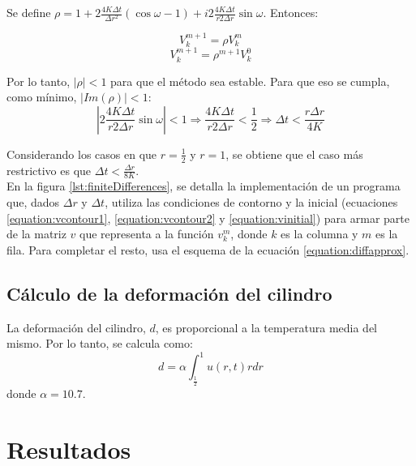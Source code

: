 \documentclass[journal, monochrome]{IEEEtran}
\begin{document}
Se define $\rho = 1 + 2 \frac{4K\Delta t}{\Delta r^{2}}(\cos \omega - 1) + i 2 \frac{4K\Delta t}{r 2\Delta r} \sin \omega$. Entonces:

\begin{equation}
V_{k}^{m+1} = \rho V_{k}^{m}
\end{equation}
\begin{equation}
V_{k}^{m+1} = \rho^{m+1} V_{k}^{0}
\end{equation}

Por lo tanto, $|\rho| < 1$ para que el método sea estable. Para que eso se cumpla, como mínimo, $|Im(\rho)| < 1$:
\begin{equation}
|2 \frac{4K\Delta t}{r 2\Delta r} \sin \omega| <1 \Rightarrow \frac{4K\Delta t}{r 2\Delta r} < \frac{1}{2} \Rightarrow \Delta t < \frac{r\Delta r}{4 K}
\end{equation}

Considerando los casos en que $r = \frac{1}{2}$ y $r = 1$, se obtiene que el caso más restrictivo es que $\Delta t < \frac{\Delta r}{8 K}$. \\

En la figura \ref{lst:finiteDifferences}, se detalla la implementación de un programa que, dados $\Delta r$ y $\Delta t$, utiliza las condiciones de contorno y la inicial (ecuaciones \eqref{equation:vcontour1}, \eqref{equation:vcontour2} y \eqref{equation:vinitial}) para armar parte de la matriz $v$ que representa a la función $v_{k}^{m}$, donde $k$ es la columna y $m$ es la fila. Para completar el resto, usa el esquema de la ecuación \eqref{equation:diffapprox}. \\



\subsection{Cálculo de la deformación del cilindro}

La deformación del cilindro, $d$, es proporcional a la temperatura media del mismo. Por lo tanto, se calcula como:
\begin{equation}
d = \alpha \int_{\frac{1}{2}}^{1} u(r,t)r dr
\label{equation:deformation}
\end{equation}
donde $\alpha = 10.7$.





\vspace{1cm}
\section{Resultados}
\label{section:results}
\vspace{0.5cm}
\end{document}

